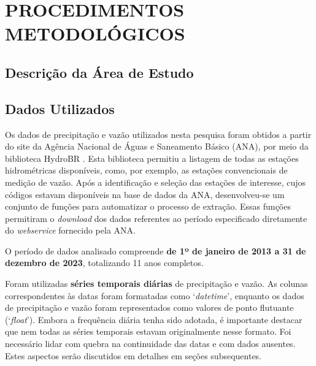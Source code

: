 \chapter{PROCEDIMENTOS METODOLÓGICOS}
\section{Descrição da Área de Estudo}

\section{Dados Utilizados}

Os dados de precipitação e vazão utilizados nesta pesquisa foram obtidos a partir do site da Agência Nacional de Águas e Saneamento Básico (ANA), por meio da biblioteca HydroBR \cite{carvalho2020hydrobr}. Esta biblioteca permitiu a listagem de todas as estações hidrométricas disponíveis, como, por exemplo, as estações convencionais de medição de vazão. Após a identificação e seleção das estações de interesse, cujos códigos estavam disponíveis na base de dados da ANA, desenvolveu-se um conjunto de funções para automatizar o processo de extração. Essas funções permitiram o \textit{download} dos dados referentes ao período especificado diretamente do \textit{webservice} fornecido pela ANA.

O período de dados analisado compreende \textbf{de 1º de janeiro de 2013 a 31 de dezembro de 2023}, totalizando 11 anos completos.

Foram utilizadas \textbf{séries temporais diárias} de precipitação e vazão. As colunas correspondentes às datas foram formatadas como `\textit{datetime}', enquanto os dados de precipitação e vazão foram representados como valores de ponto flutuante (`\textit{float}'). Embora a frequência diária tenha sido adotada, é importante destacar que nem todas as séries temporais estavam originalmente nesse formato. Foi necessário lidar com quebra na continuidade das datas e com dados ausentes. Estes aspectos serão discutidos em detalhes em seções subsequentes.

